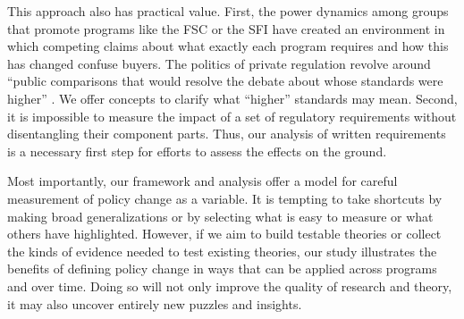 \documentclass[
      12pt,
            Review ]{article}
\begin{document}
This approach also has practical value. First, the power dynamics among
groups that promote programs like the FSC or the SFI have created an
environment in which competing claims about what exactly each program
requires and how this has changed confuse buyers. The politics of
private regulation revolve around ``public comparisons that would
resolve the debate about whose standards were higher''
\citep{Overdevest2010}. We offer concepts to clarify what ``higher''
standards may mean. Second, it is impossible to measure the impact of a
set of regulatory requirements without disentangling their component
parts. Thus, our analysis of written requirements is a necessary first
step for efforts to assess the effects on the ground.

Most importantly, our framework and analysis offer a model for careful
measurement of policy change as a variable. It is tempting to take
shortcuts by making broad generalizations or by selecting what is easy
to measure or what others have highlighted. However, if we aim to build
testable theories or collect the kinds of evidence needed to test
existing theories, our study illustrates the benefits of defining policy
change in ways that can be applied across programs and over time. Doing
so will not only improve the quality of research and theory, it may also
uncover entirely new puzzles and insights.
  \newpage 
  \theendnotes
\newpage
\singlespacing 
           
  
\end{document}
